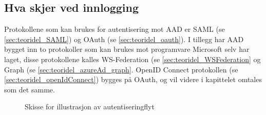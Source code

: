 \subsection{Hva skjer ved innlogging}
\label{subsec:konfigurasjon_innloggingsmekanismer_hvaSkerVedInnlogging}
Protokollene som kan brukes for autentisering mot AAD er SAML (se \ref{sec:teoridel_SAML}) og OAuth (se \ref{sec:teoridel_oauth}). I tillegg har AAD bygget inn to protokoller som kan brukes mot programvare Microsoft selv har laget, disse protokollene kalles WS-Federation (se \ref{sec:teoridel_WSFederation} og Graph (se \ref{sec:teoridel_azureAd_graph}. OpenID Connect protokollen (se \ref{sec:teoridel_openIdConnect}) bygges på OAuth, og vil videre i kapittelet omtales som det samme.

\begin{figure}
    \centering
    \setlength{\fboxsep}{0pt}%
    \setlength{\fboxrule}{0pt}%
    \caption{Skisse for illustrasjon av autentiseringflyt}
    \label{fig:authenticationFlow}
\end{figure}

